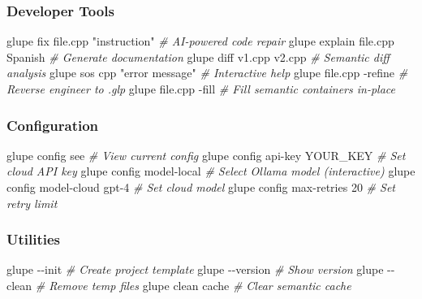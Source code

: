 \documentclass[11pt, a4paper]{article}
\newenvironment{Shaded}{\begin{snugshade}}{\end{snugshade}}
\newcommand{\AttributeTok}[1]{\textcolor[rgb]{0.77,0.63,0.00}{#1}}
\newcommand{\CommentTok}[1]{\textcolor[rgb]{0.56,0.35,0.01}{\textit{#1}}}
\newcommand{\ExtensionTok}[1]{#1}
\newcommand{\NormalTok}[1]{#1}
\newcommand{\StringTok}[1]{\textcolor[rgb]{0.31,0.60,0.02}{#1}}
\begin{document}
\subsubsection{Developer Tools}\label{developer-tools}

\begin{Shaded}
\begin{Highlighting}[]
\ExtensionTok{glupe}\NormalTok{ fix file.cpp }\StringTok{"instruction"}   \CommentTok{\# AI{-}powered code repair}
\ExtensionTok{glupe}\NormalTok{ explain file.cpp Spanish     }\CommentTok{\# Generate documentation}
\ExtensionTok{glupe}\NormalTok{ diff v1.cpp v2.cpp           }\CommentTok{\# Semantic diff analysis}
\ExtensionTok{glupe}\NormalTok{ sos cpp }\StringTok{"error message"}      \CommentTok{\# Interactive help}
\ExtensionTok{glupe}\NormalTok{ file.cpp }\AttributeTok{{-}refine}             \CommentTok{\# Reverse engineer to .glp}
\ExtensionTok{glupe}\NormalTok{ file.cpp }\AttributeTok{{-}fill}               \CommentTok{\# Fill semantic containers in{-}place}
\end{Highlighting}
\end{Shaded}

\subsubsection{Configuration}\label{configuration}

\begin{Shaded}
\begin{Highlighting}[]
\ExtensionTok{glupe}\NormalTok{ config see                   }\CommentTok{\# View current config}
\ExtensionTok{glupe}\NormalTok{ config api{-}key YOUR\_KEY      }\CommentTok{\# Set cloud API key}
\ExtensionTok{glupe}\NormalTok{ config model{-}local           }\CommentTok{\# Select Ollama model (interactive)}
\ExtensionTok{glupe}\NormalTok{ config model{-}cloud gpt{-}4     }\CommentTok{\# Set cloud model}
\ExtensionTok{glupe}\NormalTok{ config max{-}retries 20        }\CommentTok{\# Set retry limit}
\end{Highlighting}
\end{Shaded}

\subsubsection{Utilities}\label{utilities}

\begin{Shaded}
\begin{Highlighting}[]
\ExtensionTok{glupe} \AttributeTok{{-}{-}init}                       \CommentTok{\# Create project template}
\ExtensionTok{glupe} \AttributeTok{{-}{-}version}                    \CommentTok{\# Show version}
\ExtensionTok{glupe} \AttributeTok{{-}{-}clean}                      \CommentTok{\# Remove temp files}
\ExtensionTok{glupe}\NormalTok{ clean cache                  }\CommentTok{\# Clear semantic cache}
\end{Highlighting}
\end{Shaded}
\end{document}
